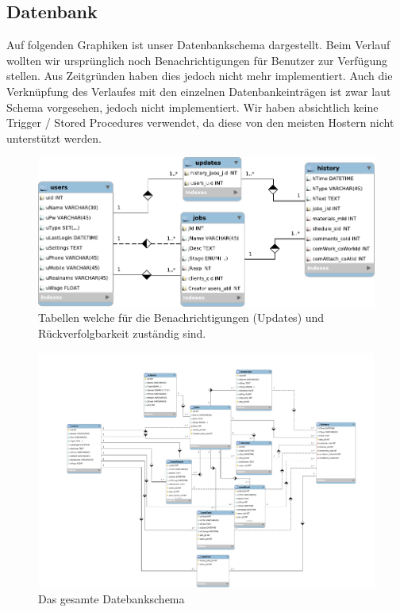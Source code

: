 \documentclass[ngerman, 12pt, pdftex]{scrartcl}[2006/07/30]
\begin{document}
\subsection{Datenbank}
Auf folgenden Graphiken ist unser Datenbankschema dargestellt. 
Beim Verlauf wollten wir ursprünglich noch Benachrichtigungen für Benutzer zur
Verfügung stellen. Aus Zeitgründen haben dies jedoch nicht mehr implementiert.
Auch die Verknüpfung des Verlaufes mit den einzelnen Datenbankeinträgen ist zwar laut Schema
vorgesehen, jedoch nicht implementiert. Wir haben absichtlich keine Trigger / Stored Procedures verwendet, da diese
von den meisten Hostern nicht unterstützt werden.
\begin{figure}[hbt]
	\centering
	\includegraphics[scale=0.9]{./db_pdfs/history.pdf}
	\caption{Tabellen welche für die Benachrichtigungen (Updates) und Rückverfolgbarkeit zuständig sind.}
\end{figure}


\begin{landscape}
\begin{figure}[p]
	\centering
	\includegraphics[scale=0.6]{./db_pdfs/everything.pdf}
	\caption{Das gesamte Datebankschema}
\end{figure}
\end{landscape}
\end{document}

